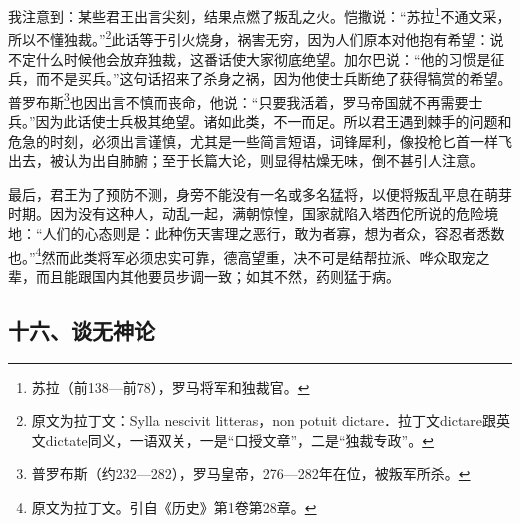 \par 我注意到：某些君王出言尖刻，结果点燃了叛乱之火。恺撒说：“苏拉\footnote{苏拉（前138—前78），罗马将军和独裁官。}不通文采，所以不懂独裁。”\footnote{原文为拉丁文：Sylla nescivit litteras，non potuit dictare．拉丁文dictare跟英文dictate同义，一语双关，一是“口授文章”，二是“独裁专政”。}此话等于引火烧身，祸害无穷，因为人们原本对他抱有希望：说不定什么时候他会放弃独裁，这番话使大家彻底绝望。加尔巴说：“他的习惯是征兵，而不是买兵。”这句话招来了杀身之祸，因为他使士兵断绝了获得犒赏的希望。普罗布斯\footnote{普罗布斯（约232—282），罗马皇帝，276—282年在位，被叛军所杀。}也因出言不慎而丧命，他说：“只要我活着，罗马帝国就不再需要士兵。”因为此话使士兵极其绝望。诸如此类，不一而足。所以君王遇到棘手的问题和危急的时刻，必须出言谨慎，尤其是一些简言短语，词锋犀利，像投枪匕首一样飞出去，被认为出自肺腑；至于长篇大论，则显得枯燥无味，倒不甚引人注意。
\par 最后，君王为了预防不测，身旁不能没有一名或多名猛将，以便将叛乱平息在萌芽时期。因为没有这种人，动乱一起，满朝惊惶，国家就陷入塔西佗所说的危险境地：“人们的心态则是：此种伤天害理之恶行，敢为者寡，想为者众，容忍者悉数也。”\footnote{原文为拉丁文。引自《历史》第1卷第28章。}然而此类将军必须忠实可靠，德高望重，决不可是结帮拉派、哗众取宠之辈，而且能跟国内其他要员步调一致；如其不然，药则猛于病。



\subsection*{十六、谈无神论}


